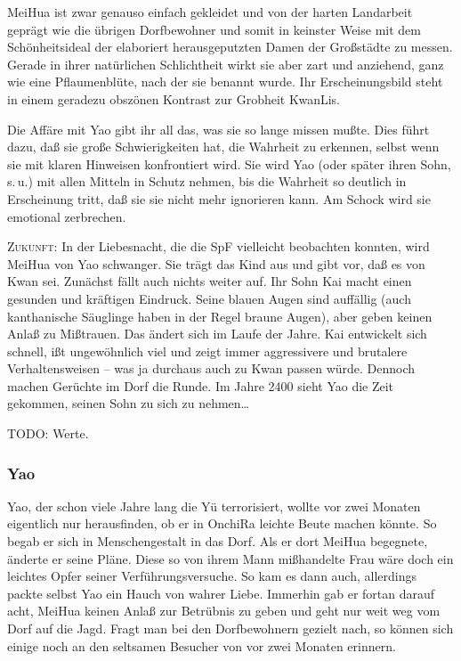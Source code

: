 \documentclass[
a4paper,
twoside,
DIV=calc,
BCOR=4mm,
fontsize=9pt,
twocolumn=on,
titlepage=on,
parskip=half
]{scrartcl}
\begin{document}
MeiHua ist zwar genauso einfach gekleidet und von der harten
Landarbeit geprägt wie die übrigen Dorfbewohner und somit in keinster
Weise mit dem Schönheitsideal der elaboriert herausgeputzten Damen der
Großstädte zu messen. Gerade in ihrer natürlichen Schlichtheit wirkt
sie aber zart und anziehend, ganz wie eine Pflaumenblüte, nach der sie
benannt wurde. Ihr Erscheinungsbild steht in einem geradezu obszönen
Kontrast zur Grobheit KwanLis.

Die Affäre mit Yao gibt ihr all das, was sie so lange missen
mußte. Dies führt dazu, daß sie große Schwierigkeiten hat, die
Wahrheit zu erkennen, selbst wenn sie mit klaren Hinweisen
konfrontiert wird. Sie wird Yao (oder später ihren Sohn, s.\,u.) mit
allen Mitteln in Schutz nehmen, bis die Wahrheit so deutlich in
Erscheinung tritt, daß sie sie nicht mehr ignorieren kann. Am Schock
wird sie emotional zerbrechen.

\textsc{Zukunft:} In der Liebesnacht, die die SpF vielleicht
beobachten konnten, wird MeiHua von Yao schwanger. Sie trägt das Kind
aus und gibt vor, daß es von Kwan sei. Zunächst fällt auch nichts
weiter auf. Ihr Sohn Kai macht einen gesunden und kräftigen
Eindruck. Seine blauen Augen sind auffällig (auch kanthanische
Säuglinge haben in der Regel braune Augen), aber geben keinen Anlaß zu
Mißtrauen. Das ändert sich im Laufe der Jahre. Kai entwickelt sich
schnell, ißt ungewöhnlich viel und zeigt immer aggressivere und
brutalere Verhaltensweisen -- was ja durchaus auch zu Kwan passen
würde. Dennoch machen Gerüchte im Dorf die Runde. Im Jahre 2400 sieht
Yao die Zeit gekommen, seinen Sohn zu sich zu nehmen\dots

TODO: Werte.

\subsubsection{Yao}
\label{yao}

Yao, der schon viele Jahre lang die Yü terrorisiert, wollte vor zwei
Monaten eigentlich nur herausfinden, ob er in OnchiRa leichte Beute
machen könnte. So begab er sich in Menschengestalt in das Dorf. Als er
dort MeiHua begegnete, änderte er seine Pläne. Diese so von ihrem Mann
mißhandelte Frau wäre doch ein leichtes Opfer seiner
Verführungsversuche. So kam es dann auch, allerdings packte selbst Yao
ein Hauch von wahrer Liebe. Immerhin gab er fortan darauf acht, MeiHua
keinen Anlaß zur Betrübnis zu geben und geht nur weit weg vom Dorf auf
die Jagd. Fragt man bei den Dorfbewohnern gezielt nach, so können sich
einige noch an den seltsamen Besucher von vor zwei Monaten erinnern.
\end{document}
